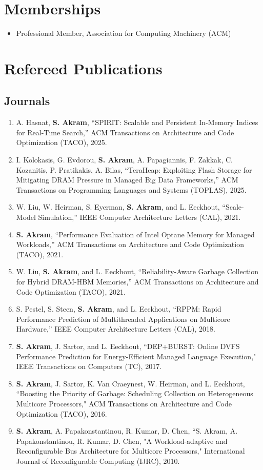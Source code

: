 \documentclass[singlecolumn,singlespace,11pt]{article}
\begin{document}
\section*{Memberships}

\begin{itemize}
\item Professional Member, Association for Computing Machinery (ACM)
\end{itemize}

\section*{Refereed Publications}
\subsection*{Journals}
\begin{enumerate}
\item
A. Hasnat, \textbf{S. Akram}, ``SPIRIT: Scalable and Persistent In-Memory Indices for Real-Time Search,'' ACM Transactions on Architecture and Code Optimization (TACO), 2025.
\item 
I. Kolokasis, G. Evdorou, \textbf{S. Akram}, A. Papagiannis, F. Zakkak, C. Kozanitis, P. Pratikakis, A. Bilas, ``TeraHeap: Exploiting Flash Storage for Mitigating DRAM Pressure in Managed Big Data Frameworks,'' ACM Transactions on Programming Languages and Systems (TOPLAS), 2025. 

\item
W. Liu, W. Heirman, S. Eyerman, \textbf{S. Akram}, and L. Eeckhout, ``Scale-Model Simulation,'' IEEE Computer Architecture Letters (CAL), 2021.
\item
\textbf{S. Akram}, ``Performance Evaluation of Intel Optane Memory for Managed Workloads,'' ACM Transactions on Architecture and Code Optimization (TACO), 2021.
\item
W. Liu, \textbf{S. Akram}, and L. Eeckhout, ``Reliability-Aware Garbage Collection for Hybrid DRAM-HBM Memories,'' ACM Transactions on Architecture and Code Optimization (TACO), 2021.
\item
S. Pestel, S. Steen, \textbf{S. Akram}, and L. Eeckhout, ``RPPM: Rapid Performance Prediction of Multithreaded Applications on Multicore Hardware,'' IEEE Computer Architecture Letters (CAL), 2018.
\item
\textbf{S. Akram}, J. Sartor, and L. Eeckhout, ``DEP+BURST: Online DVFS Performance Prediction for Energy-Efficient Managed Language Execution," IEEE Transactions on Computers (TC), 2017.
\item
\textbf{S. Akram}, J. Sartor, K. Van Craeynest, W. Heirman, and L. Eeckhout, ``Boosting the Priority of Garbage: Scheduling Collection on Heterogeneous Multicore Processors," ACM Transactions on Architecture and Code Optimization (TACO), 2016.
\item
\textbf{S. Akram}, A. Papakonstantinou, R. Kumar, D. Chen, ``S. Akram, A. Papakonstantinou, R. Kumar, D. Chen, "A Workload-adaptive and Reconfigurable Bus Architecture for Multicore Processors," 
International Journal of Reconfigurable Computing (IJRC), 2010.
\end{enumerate}
\end{document}
